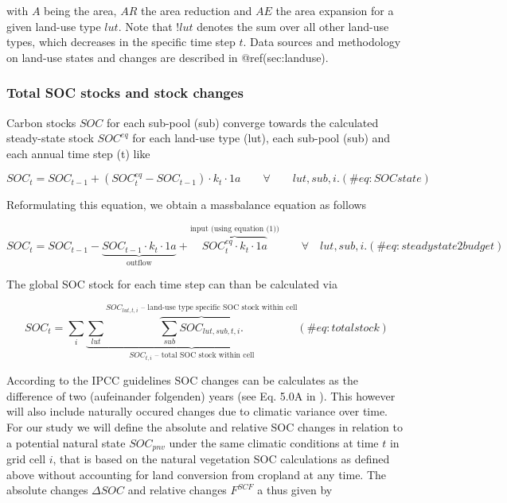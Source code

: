 \documentclass[gc, manuscript]{copernicus}
\begin{document}
with \(A\) being the area, \(AR\) the area reduction and \(AE\) the area
expansion for a given land-use type \(lut\). Note that \(!lut\) denotes
the sum over all other land-use types, which decreases in the specific
time step \(t\). Data sources and methodology on land-use states and
changes are described in @ref(sec:landuse).

\subsubsection{Total SOC stocks and stock changes}

Carbon stocks \(SOC\) for each sub-pool (sub) converge towards the
calculated steady-state stock \(SOC^{eq}\) for each land-use type (lut),
each sub-pool (sub) and each annual time step (t) like

\begin{equation}
SOC_{t} = SOC_{t-1} + (SOC^{eq}_{t} - SOC_{t-1}) \cdot k_{t} \cdot 1\unit{a} \qquad \forall\quad\quad lut, sub, i.
(\#eq:SOCstate)
\end{equation}

Reformulating this equation, we obtain a massbalance equation as follows

\begin{equation}
SOC_{t} = SOC_{t-1} - \underbrace{SOC_{t-1} \cdot k_{t} \cdot 1\unit{a}}_{\text{outflow}} + \overbrace{SOC^{eq}_{t} \cdot k_{t} \cdot 1\unit{a}}^{\text{input (using equation (1))}}  \qquad \forall\quad lut, sub, i.
(\#eq:steadystate2budget)
\end{equation}

The global SOC stock for each time step can than be calculated via

\begin{equation}
SOC_{t} = \sum_{i} \underbrace{\sum_{lut} \overbrace{\sum_{sub} SOC_{lut, sub, t, i}.}^{\text{$SOC_{lut, t, i}$ -- land-use type specific SOC stock within cell}}}_{\text{$SOC_{t, i}$ -- total SOC stock within cell}}
(\#eq:totalstock)
\end{equation}

According to the IPCC guidelines SOC changes can be calculates as the
difference of two (aufeinander folgenden) years (see Eq. 5.0A in
\citep{ipcc_2019_2019}). This however will also include naturally
occured changes due to climatic variance over time. For our study we
will define the absolute and relative SOC changes in relation to a
potential natural state \(SOC_{pnv}\) under the same climatic conditions
at time \(t\) in grid cell \(i\), that is based on the natural
vegetation SOC calculations as defined above without accounting for land
conversion from cropland at any time. The absolute changes
\(\Delta SOC\) and relative changes \(F^{SCF}\) a thus given by
\end{document}

